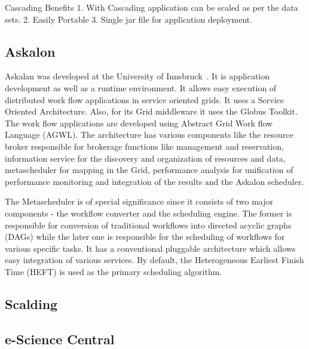     Cascading Benefits
    1. With Cascading application can be scaled as per the data sets.
    2. Easily Portable
    3. Single jar file for application deployment.

    \pv

\subsection{Askalon}

Askalan was developed at the University of
Innsbruck~\cite{RMBDP-Book}.  It is application development as well as
a runtime environment. It allows easy execution of distributed work
flow applications in service oriented grids. It uses a Service
Oriented Architecture. Also, for its Grid middleware it uses the
Globus Toolkit. The work flow applications are developed using
Abstract Grid Work flow Language (AGWL). The architecture has various
components like the resource broker responsible for brokerage
functions like management and reservation, information service for the
discovery and organization of resources and data, metascheduler for
mapping in the Grid, performance analysis for unification of
performance monitoring and integration of the results and the Askalon
scheduler.

     The Metascheduler is of special significance since it consists of
     two major components - the workflow converter and the scheduling
     engine. The former is responsible for conversion of traditional
     workflows into directed acyclic graphs (DAGs) while the later one is
     responsible for the scheduling of workflows for various specific
     tasks. It has a conventional pluggable architecture which allows easy
     integration of various services. By default, the Heterogeneous
     Earliest Finish Time (HEFT) is used as the primary scheduling
     algorithm.

\subsection{Scalding}

\subsection{e-Science Central \vc}

